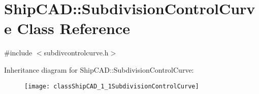 \hypertarget{classShipCAD_1_1SubdivisionControlCurve}{}\section{Ship\+C\+AD\+:\+:Subdivision\+Control\+Curve Class Reference}
\label{classShipCAD_1_1SubdivisionControlCurve}


{\ttfamily \#include $<$subdivcontrolcurve.\+h$>$}

Inheritance diagram for Ship\+C\+AD\+:\+:Subdivision\+Control\+Curve\+:\begin{figure}[H]
\begin{center}
\leavevmode
\texttt{[image: classShipCAD\_1\_1SubdivisionControlCurve]}
\end{center}
\end{figure}
